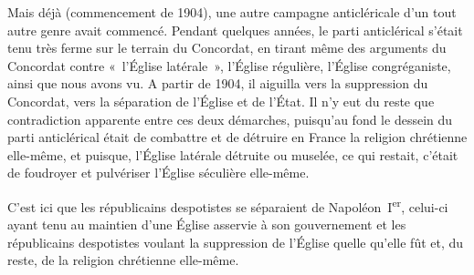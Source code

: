 \documentclass[french,twoside]{book} %
\newcommand{\astertri}{\medskip\par\centerline{\color{rubric}\large\selectfont{\syms ✻\,✻\,✻}}\medskip\par}%
\begin{document}
\astertri

\noindent Mais déjà (commencement de 1904), une autre campagne anticléricale d’un tout autre genre avait commencé. Pendant quelques années, le parti anticlérical s’était tenu très ferme sur le terrain du Concordat, en tirant même des arguments du Concordat contre « l’Église latérale », l’Église régulière, l’Église congréganiste, ainsi que nous avons vu. A partir de 1904, il aiguilla vers la suppression du Concordat, vers la séparation de l’Église et de l’État. Il n’y eut du reste que contradiction apparente entre ces deux démarches, puisqu’au fond le dessein du parti anticlérical était de combattre et de détruire en France la religion chrétienne elle-même, et puisque, l’Église latérale détruite ou muselée, ce qui restait, c’était de foudroyer et pulvériser l’Église séculière elle-même.\par
C’est ici que les républicains despotistes se  séparaient de Napoléon I\textsuperscript{er}, celui-ci ayant tenu au maintien d’une Église asservie à son gouvernement et les républicains despotistes voulant la suppression de l’Église quelle qu’elle fût et, du reste, de la religion chrétienne elle-même.\par
\end{document}
